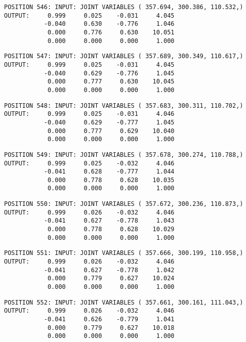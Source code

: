 \begin{verbatim}
POSITION 546: INPUT: JOINT VARIABLES ( 357.694, 300.386, 110.532,)
OUTPUT:     0.999     0.025    -0.031     4.045
           -0.040     0.630    -0.776     1.046
            0.000     0.776     0.630    10.051
            0.000     0.000     0.000     1.000
\end{verbatim} \pagebreak[1]\begin{verbatim}
POSITION 547: INPUT: JOINT VARIABLES ( 357.689, 300.349, 110.617,)
OUTPUT:     0.999     0.025    -0.031     4.045
           -0.040     0.629    -0.776     1.045
            0.000     0.777     0.630    10.045
            0.000     0.000     0.000     1.000
\end{verbatim} \pagebreak[1]\begin{verbatim}
POSITION 548: INPUT: JOINT VARIABLES ( 357.683, 300.311, 110.702,)
OUTPUT:     0.999     0.025    -0.031     4.046
           -0.040     0.629    -0.777     1.045
            0.000     0.777     0.629    10.040
            0.000     0.000     0.000     1.000
\end{verbatim} \pagebreak[1]\begin{verbatim}
POSITION 549: INPUT: JOINT VARIABLES ( 357.678, 300.274, 110.788,)
OUTPUT:     0.999     0.025    -0.032     4.046
           -0.041     0.628    -0.777     1.044
            0.000     0.778     0.628    10.035
            0.000     0.000     0.000     1.000
\end{verbatim} \pagebreak[1]\begin{verbatim}
POSITION 550: INPUT: JOINT VARIABLES ( 357.672, 300.236, 110.873,)
OUTPUT:     0.999     0.026    -0.032     4.046
           -0.041     0.627    -0.778     1.043
            0.000     0.778     0.628    10.029
            0.000     0.000     0.000     1.000
\end{verbatim} \pagebreak[1]\begin{verbatim}
POSITION 551: INPUT: JOINT VARIABLES ( 357.666, 300.199, 110.958,)
OUTPUT:     0.999     0.026    -0.032     4.046
           -0.041     0.627    -0.778     1.042
            0.000     0.779     0.627    10.024
            0.000     0.000     0.000     1.000
\end{verbatim} \pagebreak[1]\begin{verbatim}
POSITION 552: INPUT: JOINT VARIABLES ( 357.661, 300.161, 111.043,)
OUTPUT:     0.999     0.026    -0.032     4.046
           -0.041     0.626    -0.779     1.041
            0.000     0.779     0.627    10.018
            0.000     0.000     0.000     1.000
\end{verbatim} \pagebreak[1]\begin{verbatim}

\end{verbatim}
